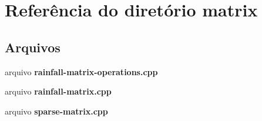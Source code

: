 \section{Referência do diretório matrix}
\label{dir_4f064daea4bb5e8423442f4fbd522329}
\subsection*{Arquivos}
\begin{DoxyCompactItemize}
\item 
arquivo {\bf rainfall-\/matrix-\/operations.\+cpp}
\item 
arquivo {\bf rainfall-\/matrix.\+cpp}
\item 
arquivo {\bf sparse-\/matrix.\+cpp}
\end{DoxyCompactItemize}
